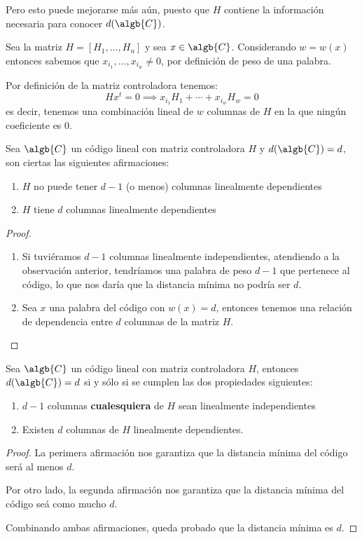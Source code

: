 Pero esto puede mejorarse más aún, puesto que $H$ contiene la información necesaria para conocer $d(\algb{C})$.

\begin{obs}
Sea la matriz $H=[H_1,...,H_n]$ y sea $x \in \algb{C}$. Considerando $w=w(x)$ entonces sabemos que $x_{i_1},...,x_{i_w}\neq 0$, por definición de peso de una palabra.

Por definición de la matriz controladora tenemos:
\[Hx^t=0 \implies x_{i_1}H_1 + \cdots + x_{i_w}H_w = 0\]
es decir, tenemos una combinación lineal de $w$ columnas de $H$ en la que ningún coeficiente es 0.
\end{obs}

\begin{prop}
Sea $\algb{C}$ un código lineal con matriz controladora $H$ y $d(\algb{C})=d$, son ciertas las siguientes afirmaciones:
\begin{enumerate}
\item $H$ no puede tener $d-1$ (o menos) columnas linealmente dependientes
\item $H$ tiene $d$ columnas linealmente dependientes
\end{enumerate}
\end{prop}
\begin{proof}
\begin{enumerate}
\item Si tuviéramos $d-1$ columnas linealmente independientes, atendiendo a la observación anterior, tendríamos una palabra de peso $d-1$ que pertenece al código, lo que nos daría que la distancia mínima no podría ser $d$.

\item Sea $x$ una palabra del código con $w(x)=d$, entonces tenemos una relación de dependencia entre $d$ columnas de la matriz $H$.
\end{enumerate}
\end{proof}

\begin{corol}
Sea $\algb{C}$ un código lineal con matriz controladora $H$, entonces $d(\algb{C})=d$ si y sólo si se cumplen las dos propiedades siguientes:
\begin{enumerate}
\item $d-1$ columnas \textbf{cualesquiera} de $H$ sean linealmente independientes
\item Existen $d$ columnas de $H$ linealmente dependientes.
\end{enumerate}
\end{corol}
\begin{proof}
La perimera afirmación nos garantiza que la distancia mínima del código será al menos $d$.

Por otro lado, la segunda afirmación nos garantiza que la distancia mínima del código seá como mucho $d$.

Combinando ambas afirmaciones, queda probado que la distancia mínima es $d$.
\end{proof}

